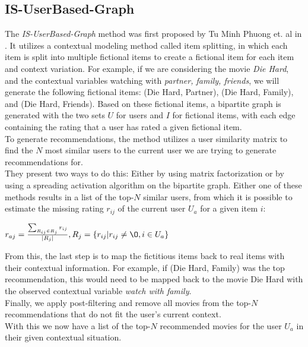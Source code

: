 \subsection{IS-UserBased-Graph}
The \textit{IS-UserBased-Graph} method was first proposed by Tu Minh Phuong et. al in \cite{GraphBasedCollaborativePaper}.
It utilizes a contextual modeling method called item splitting, in which each item is split into multiple fictional items to create a fictional item for each item and context variation.
For example, if we are considering the movie \textit{Die Hard}, and the contextual variables watching with \textit{partner, family, friends}, we will generate the following fictional items: (Die Hard, Partner), (Die Hard, Family), and (Die Hard, Friends).
Based on these fictional items, a bipartite graph is generated with the two sets $U$ for users and $I$ for fictional items, with each edge containing the rating that a user has rated a given fictional item.\\
To generate recommendations, the method utilizes a user similarity matrix to find the $N$ most similar users to the current user we are trying to generate recommendations for.\\
They present two ways to do this: Either by using matrix factorization or by using a spreading activation algorithm on the bipartite graph.
Either one of these methods results in a list of the top-$N$ similar users, from which it is possible to estimate the missing rating $r_{ij}$ of the current user $U_a$ for a given item $i$:

$r_{aj} = \frac{\sum_{R_{ij} \in R_j} r_{ij}}{|R_j|}, R_j = \{ r_{ij} | r_{ij} \neq \O , i \in U_a \}$

From this, the last step is to map the fictitious items back to real items with their contextual information.
For example, if (Die Hard, Family) was the top recommendation, this would need to be mapped back to the movie Die Hard with the observed contextual variable \textit{watch with family}.\\
Finally, we apply post-filtering and remove all movies from the top-$N$ recommendations that do not fit the user's current context.\\
With this we now have a list of the top-$N$ recommended movies for the user $U_a$ in their given contextual situation.
